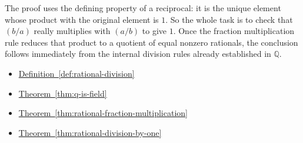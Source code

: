 \begin{remark*}
The proof uses the defining property of a reciprocal: it is the unique
element whose product with the original element is $1$.  So the whole task is
to check that $(b/a)$ really multiplies with $(a/b)$ to give $1$.  Once the
fraction multiplication rule reduces that product to a quotient of equal
nonzero rationals, the conclusion follows immediately from the internal
division rules already established in $\mathbb{Q}$.
\end{remark*}

\begin{dependencies}
\begin{itemize}
  \item \hyperref[def:rational-division]{Definition~\ref*{def:rational-division}}
  \item \hyperref[thm:q-is-field]{Theorem~\ref*{thm:q-is-field}}
  \item \hyperref[thm:rational-fraction-multiplication]{Theorem~\ref*{thm:rational-fraction-multiplication}}
  \item \hyperref[thm:rational-division-by-one]{Theorem~\ref*{thm:rational-division-by-one}}
\end{itemize}
\end{dependencies}

\clearpage
